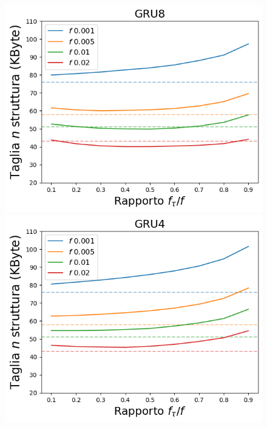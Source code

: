 \documentclass{beamer}
\begin{document}
\begin{frame}
\begin{figure}[htbp]
\begin{minipage}{0.25\textwidth}
        \end{minipage}%
        \hfill
        \begin{minipage}{0.25\textwidth}
        \centering
        \includegraphics[width=\textwidth]{immagini/7/LBF/GRU8_Taglia.png}
        \end{minipage}%
        \hfill
        \begin{minipage}{0.25\textwidth}
        \centering
        \includegraphics[width=\textwidth]{immagini/7/LBF/GRU4_Taglia.png}
        \end{minipage}%
        \hfill


\end{figure}
\end{frame}
\end{document}
